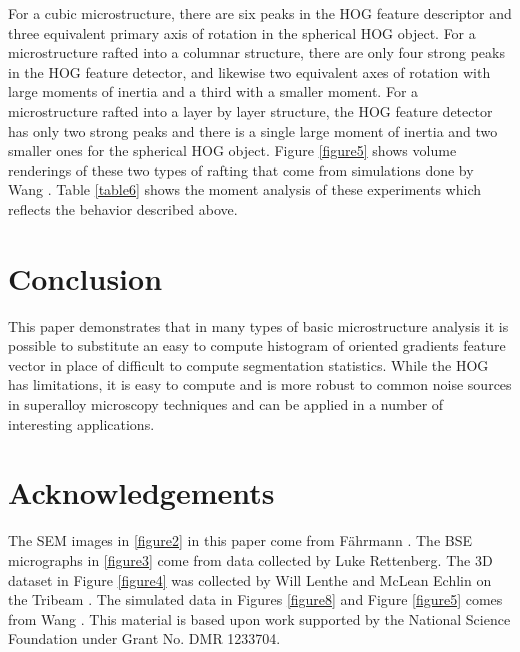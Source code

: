\documentclass[review]{elsarticle}
\begin{document}
	For a cubic microstructure, there are six peaks in the HOG feature descriptor and three equivalent primary axis of rotation in the spherical HOG object. For a microstructure rafted into a columnar structure, there are only four strong peaks in the HOG feature detector, and likewise two equivalent axes of rotation with large moments of inertia and a third with a smaller moment. For a microstructure rafted into a layer by layer structure, the HOG feature detector has only two strong peaks and there is a single large moment of inertia and two smaller ones for the spherical HOG object. Figure \ref{figure5} shows volume renderings of these two types of rafting that come from simulations done by Wang \cite{ywang2}. Table \ref{table6} shows the moment analysis of these experiments which reflects the behavior described above.
	
	\section{Conclusion}
	
	This paper demonstrates that in many types of basic microstructure analysis it is possible to substitute an easy to compute histogram of oriented gradients feature vector in place of difficult to compute segmentation statistics. While the HOG has limitations, it is easy to compute and is more robust to common noise sources in superalloy microscopy techniques and can be applied in a number of interesting applications.
	
	\section{Acknowledgements}
	
	The SEM images in \ref{figure2} in this paper come from F\"ahrmann \cite{faehrmann}. The BSE micrographs in \ref{figure3} come from data collected by Luke Rettenberg. The 3D dataset in Figure \ref{figure4} was collected by Will Lenthe and McLean Echlin on the Tribeam \cite{tribeam}. The simulated data in Figures \ref{figure8} and Figure \ref{figure5} comes from Wang \cite{ywang2}. This material is based upon work supported by the National Science Foundation under Grant No. DMR 1233704.

	
\end{document}
